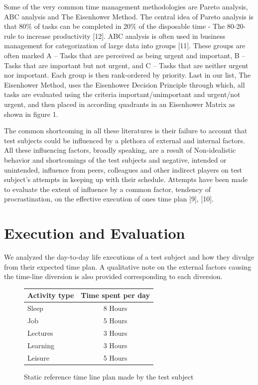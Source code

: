 \documentclass[conference]{IEEEtran}
\begin{document}
Some of the very common time management methodologies are Pareto analysis, ABC analysis and The Eisenhower Method. The central idea of Pareto analysis is that 80\% of tasks can be completed in 20\% of the disposable time - The 80-20-rule to increase productivity [12]. ABC analysis is often used in business management for categorization of large data into groups [11]. These groups are often marked A -- Tasks that are perceived as being urgent and important, B -- Tasks that are important but not urgent, and C -- Tasks that are neither urgent nor important. Each group is then rank-ordered by priority. Last in our list, The Eisenhower Method, uses the Eisenhower Decision Principle through which, all tasks are evaluated using the criteria important/unimportant and urgent/not urgent, and then placed in according quadrants in an Eisenhower Matrix as shown in figure 1.


The common shortcoming in all these literatures is their failure to account that test subjects could be influenced by a plethora of external and internal factors. All these influencing factors, broadly speaking, are a result of Non-idealistic behavior and shortcomings of the test subjects and negative, intended or unintended, influence from peers, colleagues and other indirect players on test subject's attempts in keeping up with their schedule. Attempts have been made to evaluate the extent of influence by a common factor, tendency of procrastination, on the effective execution of ones time plan [9], [10].


\section{Execution and Evaluation}
We analyzed the day-to-day life executions of a test subject and how they divulge from their expected time plan. A qualitative note on the external factors causing the time-line diversion is also provided corresponding to each diversion.


\begin{figure}[hb]
  \centering
	  \begin{tabular}{ | l | c | }
		\hline
		\textbf{Activity type} 	& \textbf{Time spent per day} 	\\ \hline
		Sleep					& 	8 Hours						\\ \hline
		Job						& 	5 Hours						\\ \hline
		Lectures				& 	3 Hours						\\ \hline
		Learning				& 	3 Hours						\\ \hline
		Leisure					& 	5 Hours						\\ \hline
	  \end{tabular} 
  \caption[]
   {Static reference time line plan made by the test subject}
\end{figure}
\end{document}
